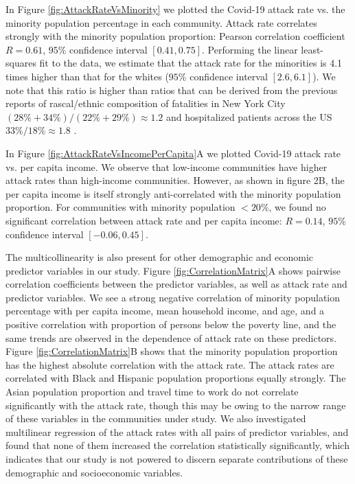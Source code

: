 \documentclass[twoside,12pt,onecolumn]{article}
\begin{document}
In Figure \ref{fig:AttackRateVsMinority} we plotted the Covid-19 attack rate vs. the minority population percentage in each community.
Attack rate correlates strongly with the minority population proportion: Pearson correlation coefficient $R=0.61$,
$95\%$ confidence interval $[0.41,0.75]$.
Performing the linear least-squares fit to the data, we estimate that the attack rate for the minorities is 4.1 times higher than that for the whites ($95\%$ confidence interval $[2.6,6.1]$).
We note that this ratio is higher than ratios that can be derived from the previous reports of rascal/ethnic composition of fatalities in New York City
$(28\%+34\%)/(22\%+29\%) \approx 1.2$
\cite{NYS_COVID19_tracker} and hospitalized patients across the US $ 33\%/18\% \approx 1.8 $ \cite{COVID-NET_2020}.

In Figure \ref{fig:AttackRateVsIncomePerCapita}A we plotted Covid-19 attack rate vs. per capita income.
We observe that low-income communities have higher attack rates than high-income communities.
However, as shown in figure 2B, the per capita income is itself strongly anti-correlated with the minority population proportion.
For communities with minority population $<20\%$, we found no significant correlation between attack rate and per capita income: $R=0.14$, $95\%$ confidence interval $[-0.06,0.45]$.

The multicollinearity is also present for other demographic and economic predictor variables in our study.
Figure \ref{fig:CorrelationMatrix}A shows pairwise correlation coefficients between the predictor variables, as well as attack rate and predictor variables.
We see a strong negative correlation of minority population percentage with per capita income, mean household income, and age, and a positive correlation with proportion of persons below the poverty line, and the same trends are observed in the dependence of attack rate on these predictors.
Figure \ref{fig:CorrelationMatrix}B shows that the minority population proportion has the highest absolute correlation with the attack rate. The attack rates are correlated with Black and Hispanic population proportions equally strongly. The Asian population proportion and travel time to work do not correlate significantly with the attack rate, though this may be owing to the narrow range of these variables in the communities under study.
We also investigated multilinear regression of the attack rates with all pairs of predictor variables, and found that none of them increased the correlation statistically significantly, which indicates that our study is not powered to discern separate contributions of these demographic and socioeconomic variables.
\end{document}
